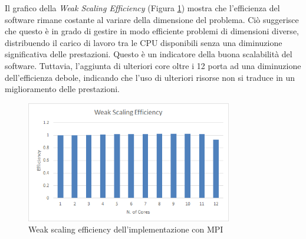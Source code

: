 \documentclass[a4paper, 12pt]{report}
\begin{document}
\begin{sloppypar}
  \newpage
  \noindent
  Il grafico della \textit{Weak Scaling Efficiency} (Figura \ref{fig:mpi_wse}) mostra che l'efficienza del software rimane costante 
  al variare della dimensione del problema. Ciò suggerisce che questo è in grado di gestire in modo 
  efficiente problemi di dimensioni diverse, distribuendo il carico di lavoro tra le CPU disponibili senza 
  una diminuzione significativa delle prestazioni. Questo è un indicatore della buona scalabilità del software. 
  Tuttavia, l'aggiunta di ulteriori core oltre i 12 porta ad una diminuzione dell'efficienza debole, 
  indicando che l'uso di ulteriori risorse non si traduce in un miglioramento delle prestazioni.

  \begin{figure}[ht]
    \centering
    \includegraphics[width=9cm]{img/mpi-wse.png}
    \caption{Weak scaling efficiency dell'implementazione con MPI}
    \label{fig:mpi_wse}
  \end{figure}

\end{sloppypar}
\end{document}
